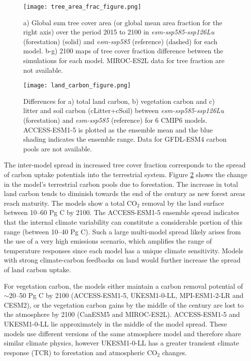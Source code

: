 \documentclass[draft]{agujournal2019}
\begin{document}
\begin{figure}
    \texttt{[image: tree\_area\_frac\_figure.png]}
    \caption{a) Global sum tree cover area (or global mean area fraction for the right axis) over the period 2015 to 2100 in \textit{esm-ssp585-ssp126Lu} (forestation) (solid) and \textit{esm-ssp585} (reference) (dashed) for each model. b-g) 2100 maps of tree cover fraction difference between the simulations for each model. MIROC-ES2L data for tree fraction are not available.}
    \label{fig:land_use_map}
\end{figure}

\begin{figure}
    \texttt{[image: land\_carbon\_figure.png]}
    \caption{Differences for a) total land carbon, b) vegetation carbon and c) litter and soil carbon (cLitter+cSoil) between \textit{esm-ssp585-ssp126Lu} (forestation) and \textit{esm-ssp585} (reference) for 6 CMIP6 models. ACCESS-ESM1-5 is plotted as the ensemble mean and the blue shading indicates the ensemble range. Data for GFDL-ESM4 carbon pools are not available.}
    \label{fig:models_cpools}
\end{figure}

The inter-model spread in increased tree cover fraction corresponds to the spread of carbon uptake potentials into the terrestrial system.
Figure \ref{fig:models_cpools} shows the change in the model's terrestrial carbon pools due to forestation.
The increase in total land carbon tends to diminish towards the end of the century as new forest areas reach maturity.
The models show a total CO$_2$ removal by the land surface between 10--60 Pg C by 2100.
The ACCESS-ESM1-5 ensemble spread indicates that the internal climate variability can constitute a considerable portion of this range (between 10--40 Pg C).
Such a large multi-model spread likely arises from the use of a very high emissions scenario, which amplifies the range of temperature responses since each model has a unique climate sensitivity.
Models with strong climate-carbon feedbacks on land would further increase the spread of land carbon uptake.

For vegetation carbon, the models either maintain a carbon removal potential of $\sim$20--50 Pg C by 2100 (ACCESS-ESM1-5, UKESM1-0-LL, MPI-ESM1-2-LR and CESM2), or the vegetation carbon gains by the middle of the century are lost to the atmosphere by 2100 (CanESM5 and MIROC-ES2L).
ACCESS-ESM1-5 and UKESM1-0-LL lie approximately in the middle of the model spread.
These models use different versions of the same atmosphere model and therefore share similar climate physics, however UKESM1-0-LL has a greater transient climate response (TCR) to forestation and atmospheric CO$_2$ changes.
\end{document}
